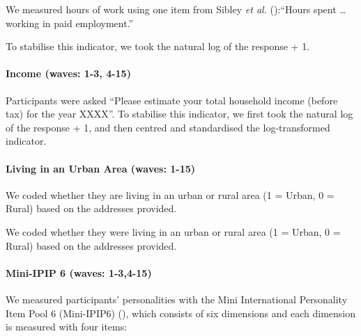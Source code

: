 \documentclass[
  singlecolumn]{article}
\let\oldparagraph\paragraph
\renewcommand{\paragraph}[1]{\oldparagraph{#1}\mbox{}}
\begin{document}
We measured hours of work using one item from Sibley \emph{et al.}
():``Hours spent \ldots{} working in paid
employment.''

To stabilise this indicator, we took the natural log of the response +
1.

\paragraph{Income (waves: 1-3, 4-15)}\label{income-waves-1-3-4-15}

Participants were asked ``Please estimate your total household income
(before tax) for the year XXXX''. To stabilise this indicator, we first
took the natural log of the response + 1, and then centred and
standardised the log-transformed indicator.

\paragraph{Living in an Urban Area (waves:
1-15)}\label{living-in-an-urban-area-waves-1-15}

We coded whether they are living in an urban or rural area (1 = Urban, 0
= Rural) based on the addresses provided.

We coded whether they were living in an urban or rural area (1 = Urban,
0 = Rural) based on the addresses provided.

\paragraph{Mini-IPIP 6 (waves:
1-3,4-15)}\label{mini-ipip-6-waves-1-34-15}

We measured participants' personalities with the Mini International
Personality Item Pool 6 (Mini-IPIP6) (), which consists of six dimensions and each
dimension is measured with four items:
\end{document}
